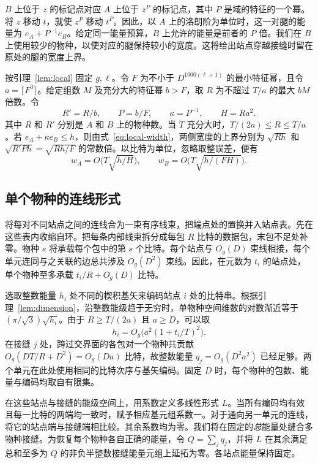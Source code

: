 $B$ 上位于 $z$ 的标记点对应 $A$ 上位于 $z^P$ 的标记点，其中 $P$ 是域的特征的一个幂。将 $z$ 移动 $t$，就使 $z^P$ 移动 $t^P$。因此，以 $A$ 上的洛朗阶为单位时，这一对腿的能量为 $e_A+P^{-1}e_B$。给定同一能量预算，$B$ 上允许的能量是前者的 $P$ 倍。我们在 $B$ 上使用较少的物种，以使对应的腿保持较小的宽度。这将给出站点穿越接缝时留在原处的腿的宽度上界。

按引理~\ref{lem:local} 固定 $g,\ell$。令 $F$ 为不小于 $D^{1000(\ell+1)}$ 的最小特征幂，且令 $a=\lceil F^3\rceil$。给定组数 $M$ 及充分大的特征幂 $b>F$，取 $R$ 为不超过 $T/a$ 的最大 $bM$ 倍数。令
\begin{equation}\label{eq:plant-scales}
 R'=R/b,\qquad P=b/F,\qquad \kappa=P^{-1},\qquad H=Ra^2 .
\end{equation} 其中 $R$ 和 $R'$ 分别是 $A$ 和 $B$ 上的物种数。当 $T$ 充分大时，$T/(2a)\le R\le T/a$。若 $e_A+\kappa e_B\le h$，则由式~\eqref{eq:local-width}，两侧宽度的上界分别为 $\sqrt{Rh}$ 和 $\sqrt{R'Ph}=\sqrt{Rh/F}$ 的常数倍。以比特为单位，忽略取整误差，便有
\begin{equation}\label{eq:plant-widths}
 w_A=O\bigl(T\sqrt{h/H}\bigr),\qquad
 w_B=O\bigl(T\sqrt{h/(FH)}\bigr).
\end{equation}

\subsection{单个物种的连线形式}

将每对不同站点之间的连线合为一束有序线束，把端点处的置换并入站点表。先在这些表内收缩自环。把每条内部线束拆分成每包 $R$ 比特的数据包，末包不足处补零。物种 $s$ 将承载每个包中的第 $s$ 个比特。每个站点与 $O_g(D)$ 束线相接，每个单元连同与之关联的边总共涉及 $O_g(D^2)$ 束线。因此，在元数为 $t_i$ 的站点处，单个物种至多承载 $t_i/R+O_g(D)$ 比特。

选取整数能量 $h_i$ 处不同的楔积基矢来编码站点 $i$ 处的比特串。根据引理~\ref{lem:dimension}，沿整数能级趋于无穷时，单物种空间维数的对数渐近等于 $(\pi/\sqrt3)\sqrt{h_i}$。由于 $R\ge T/(2a)$ 且 $a\ge D$，可以取 \[
                 h_i=O_g\bigl(a^2(1+t_i/T)^2\bigr).
\] 在接缝 $j$ 处，跨过交界面的各包对一个物种共贡献 $O_g(DT/R+D^2)=O_g(Da)$ 比特，故整数能量 $q_j=O_g(D^2a^2)$ 已经足够。两个单元在此处使用相同的比特次序与基矢编码。固定 $D$ 时，每个物种的包数、能量与编码均取自有限集。

在这些站点与接缝的能级空间上，用系数定义多线性形式 $L$。当所有编码均有效且每一比特的两端均一致时，赋予相应基元组系数一。对于通向另一单元的连线，将它的站点端与接缝端相比较。其余系数均为零。我们将在固定的\emph{总}能量处缝合多物种接缝。为恢复每个物种各自正确的能量，令 $Q=\sum_j q_j$，并将 $L$ 在其余满足总和至多为 $Q$ 的非负半整数接缝能量元组上延拓为零。各站点能量保持固定。

